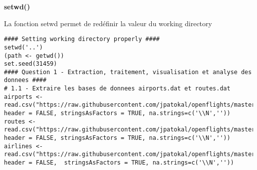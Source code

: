 \documentclass{report}
\newenvironment{moreInfo}[1]
	{\begin{mdframed}
	\textcolor{NavyBlue}{\huge \raisebox{-3.5pt}{\faInfo} 
	\hspace{0.5cm} \large\bfseries #1}\\[5pt]
	\normalsize
	\makebox[0.1\textwidth][l]{}	
	\begin{minipage}{10cm}}
	{	\end{minipage}
	\end{mdframed}}
\begin{document}
\begin{moreInfo}{setwd()}
	La fonction setwd permet de redéfinir la valeur du working directory
\end{moreInfo}
\begin{lstlisting}
#### Setting working directory properly ####
setwd('..')
(path <- getwd())
set.seed(31459)
#### Question 1 - Extraction, traitement, visualisation et analyse des donnees ####
# 1.1 - Extraire les bases de donnees airports.dat et routes.dat
airports <- read.csv("https://raw.githubusercontent.com/jpatokal/openflights/master/data/airports.dat", header = FALSE, stringsAsFactors = TRUE, na.strings=c('\\N',''))
routes <- read.csv("https://raw.githubusercontent.com/jpatokal/openflights/master/data/routes.dat", header = FALSE, stringsAsFactors = TRUE, na.strings=c('\\N',''))
airlines <- read.csv("https://raw.githubusercontent.com/jpatokal/openflights/master/data/airlines.dat", header = FALSE,  stringsAsFactors = TRUE, na.strings=c('\\N',''))
\end{lstlisting}
\end{document}
